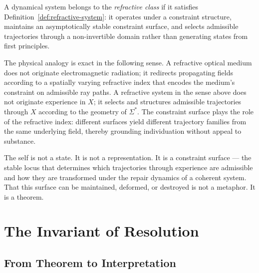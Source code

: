 \documentclass[11pt,openany]{book}
\begin{document}
A dynamical system belongs to the \emph{refractive class}
if it satisfies Definition~\ref{def:refractive-system}: it
operates under a constraint structure, maintains an
asymptotically stable constraint surface, and selects
admissible trajectories through a non-invertible domain
rather than generating states from first principles.

The physical analogy is exact in the following sense.  A
refractive optical medium does not originate electromagnetic
radiation; it redirects propagating fields according to a
spatially varying refractive index that encodes the medium's
constraint on admissible ray paths.  A refractive system in
the sense above does not originate experience in $X$; it
selects and structures admissible trajectories through $X$
according to the geometry of $\Sigma^*$.  The constraint
surface plays the role of the refractive index: different
surfaces yield different trajectory families from the same
underlying field, thereby grounding individuation without
appeal to substance.

The self is not a state.  It is not a representation.  It
is a constraint surface --- the stable locus that determines
which trajectories through experience are admissible and how
they are transformed under the repair dynamics of a coherent
system.  That this surface can be maintained, deformed, or
destroyed is not a metaphor.  It is a theorem.


\chapter{The Invariant of Resolution}
\label{ch:invariant-resolution}

\section{From Theorem to Interpretation}
\label{sec:from-theorem}
\end{document}
